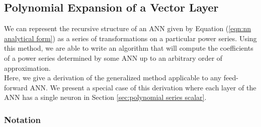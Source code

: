 
\subsection{Polynomial Expansion of a Vector Layer}
\label{sec:polynomial series vector}

We can represent the recursive structure of an ANN given by Equation (\ref{eqn:nn analytical form}) as a series of transformations on a particular power series. Using this method, we are able to write an algorithm that will compute the coefficients of a power series determined by some ANN up to an arbitrary order of approximation.\\

Here, we give a derivation of the generalized method applicable to any feed-forward ANN.
We present a special case of this derivation where each layer of the ANN has a single neuron in Section \ref{sec:polynomial series scalar}.

\subsubsection{Notation}

